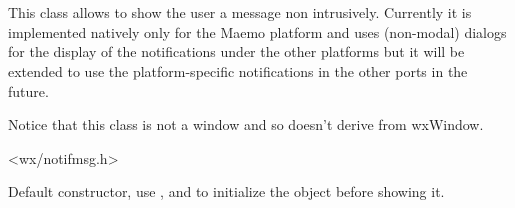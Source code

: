 
\section{}\label{wxnotificationmessage}

This class allows to show the user a message non intrusively. Currently it is
implemented natively only for the Maemo platform and uses (non-modal) dialogs
for the display of the notifications under the other platforms but it will be
extended to use the platform-specific notifications in the other ports in the
future.

Notice that this class is not a window and so doesn't derive from wxWindow.




<wx/notifmsg.h>



\label{wxnotificationmessagewxnotificationmessage}


Default constructor, use , 
 and 
 to initialize the object
before showing it.


